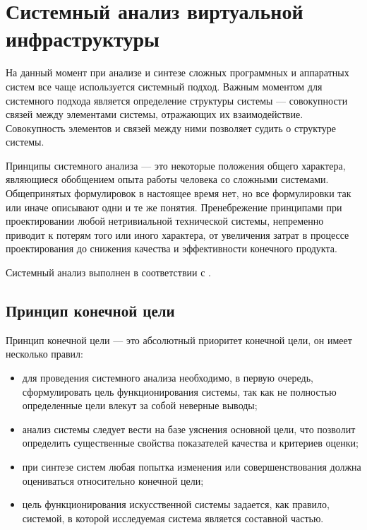 \section{Системный анализ виртуальной инфраструктуры}

На данный момент при анализе и синтезе сложных программных и аппаратных систем все чаще используется системный подход.
Важным моментом для системного подхода является определение структуры системы --- совокупности связей между элементами системы, отражающих их взаимодействие.
Совокупность элементов и связей между ними позволяет судить о структуре системы.

Принципы системного анализа --- это некоторые положения общего характера, являющиеся обобщением опыта работы человека со сложными системами.
Общепринятых формулировок в настоящее время нет, но все формулировки так или иначе описывают одни и те же понятия.
Пренебрежение принципами при проектировании любой нетривиальной технической системы, непременно приводит к потерям того или иного характера, от увеличения затрат в процессе проектирования до снижения качества и эффективности конечного продукта.

Системный анализ выполнен в соответствии с \cite{sys-analyz}.

\subsection{Принцип конечной цели} \label{goal}

Принцип конечной цели --- это абсолютный приоритет конечной цели, он имеет несколько правил:
\begin{itemize}
  \item для проведения системного анализа необходимо, в первую очередь, сформулировать цель функционирования системы, так как не полностью определенные цели влекут за собой неверные выводы;
  \item анализ системы следует вести на базе уяснения основной цели, что позволит определить существенные свойства показателей качества и критериев оценки;
  \item при синтезе систем любая попытка изменения или совершенствования должна оцениваться относительно конечной цели;
  \item цель функционирования искусственной системы задается, как правило, системой, в которой исследуемая система является составной частью.
\end{itemize}

